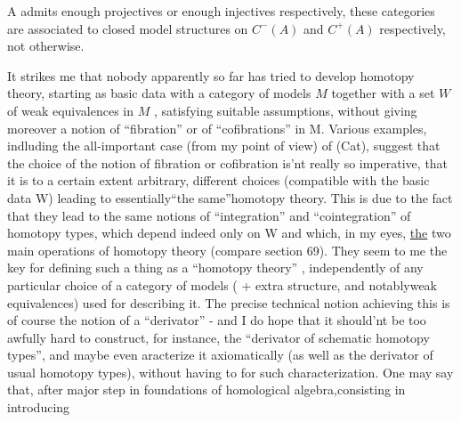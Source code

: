 
A admits enough projectives or enough injectives respectively,  these
categories are associated to closed model structures on $C^{-}(A)$ and $C^{+}(A)$
respectively,    not otherwise.

It strikes me that nobody apparently so far has tried to develop
homotopy theory,  starting as basic data with a category of models  $M$
together with a set $W$ of weak equivalences in $M$ ,  satisfying suitable
assumptions,  without giving moreover a notion of ``fibration'' or of
``cofibrations'' in M.  Various examples,   indluding the all-important
case (from my point of view) of (Cat),  suggest that the choice of the
notion of fibration or cofibration is'nt really so imperative,  that it
is to a certain extent arbitrary,  different choices (compatible with the
basic data W) leading to essentially\hand{/}``the same''\hand{/}homotopy theory.  This 
is due to the fact that they lead to the same notions of ``integration'' and
``cointegration'' of homotopy types,  which depend indeed only on W and
which,  in my eyes,   \uline{the} two main operations of homotopy theory
(compare section 69).  They seem to me the key for defining such a thing
as a  ``homotopy theory'' ,  independently of any particular choice of
a category of models ( + extra structure, and notably\hand{,}weak equivalences)
used for describing it.  The precise technical notion achieving this is
of course the notion of a ``derivator'' - and I do hope that it should'nt
be too awfully hard to construct,  for instance,  the ``derivator of
schematic homotopy types'',  and maybe even aracterize it axiomatically
(as well as the derivator of usual homotopy types),  without having to
 for such characterization.  One may say that,  after   major
step in  foundations of homological algebra,\hand{|}consisting in introducing 

